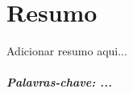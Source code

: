 \chapter*{Resumo}
\thispagestyle{empty}

Adicionar resumo aqui...

\vspace{50pt}

\paragraph{Palavras-chave: ...}
